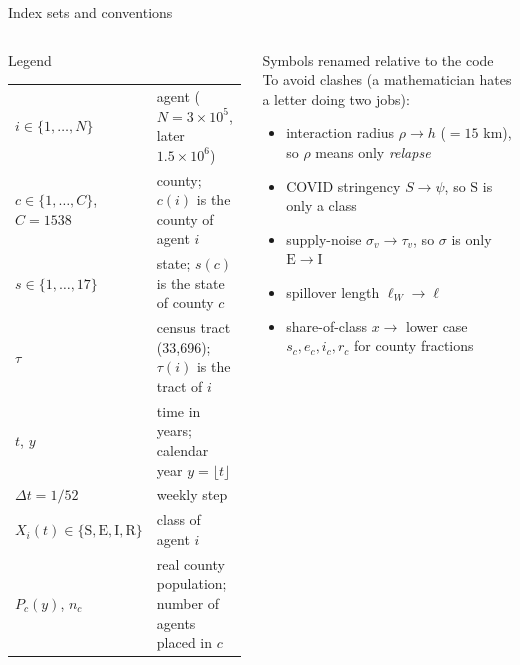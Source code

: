 ﻿\documentclass[9pt,aspectratio=169]{beamer}
\newenvironment{legend}{\begin{block}{Legend}\scriptsize}{\end{block}}
\newcommand{\Sc}{\mathrm{S}}\newcommand{\Ec}{\mathrm{E}}\newcommand{\Ic}{\mathrm{I}}\newcommand{\Rc}{\mathrm{R}}\newcommand{\Dc}{\mathrm{D}}
\begin{document}
\begin{frame}{Index sets and conventions}
 \begin{columns}[T]
 \begin{legend}
 \renewcommand{\arraystretch}{1.25}
 \begin{tabular}{@{}p{2.6cm}p{5.4cm}@{}}
 $i\in\{1,\dots,N\}$ & agent ($N=3\times10^5$, later $1.5\times10^6$)\\
 $c\in\{1,\dots,C\}$, $C=1538$ & county; $c(i)$ is the county of agent $i$\\
 $s\in\{1,\dots,17\}$ & state; $s(c)$ is the state of county $c$\\
 $\tau$ & census tract (33{,}696); $\tau(i)$ is the tract of $i$\\
 $t$, $y$ & time in years; calendar year $y=\lfloor t\rfloor$\\
 $\Delta t=1/52$ & weekly step\\
 $X_i(t)\in\{\Sc,\Ec,\Ic,\Rc\}$ & class of agent $i$\\
 $P_c(y)$, $n_c$ & real county population; number of agents placed in $c$
 \end{tabular}
 \end{legend}
 \begin{block}{Symbols renamed relative to the code}\small
 To avoid clashes (a mathematician hates a letter doing two jobs):
 \begin{itemize}\setlength\itemsep{1pt}
  \item interaction radius $\rho\to h$ ($=15$ km), so $\rho$ means only \emph{relapse}
  \item COVID stringency $S\to\psi$, so $\Sc$ is only a class
  \item supply-noise $\sigma_v\to\tau_v$, so $\sigma$ is only $\Ec\to\Ic$
  \item spillover length $\ell_W\to\ell$
  \item share-of-class $x\to$ lower case $s_c,e_c,i_c,r_c$ for county fractions
 \end{itemize}
 \end{block}
 \end{columns}
\end{frame}

\end{document}
